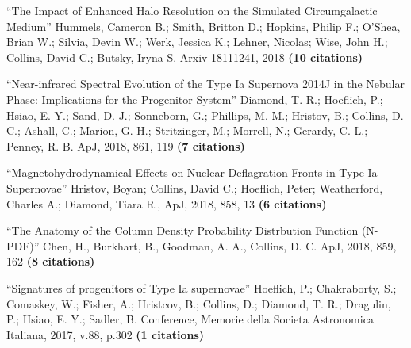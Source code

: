 \newcommand{\citeform}[1]{{\bf (#1 citations)}}

\medskip
\noindent
``The Impact of Enhanced Halo Resolution on the Simulated Circumgalactic Medium''
Hummels, Cameron B.; Smith, Britton D.; Hopkins, Philip F.; O'Shea, Brian W.; Silvia, Devin W.; 
Werk, Jessica K.; Lehner, Nicolas; Wise, John H.; Collins, David C.; Butsky, Iryna S.   
Arxiv 18111241, 2018
\citeform{10}%

\medskip
\noindent
``Near-infrared Spectral Evolution of the Type Ia Supernova 2014J in the Nebular
Phase: Implications for the Progenitor System''
Diamond, T. R.; Hoeflich, P.; Hsiao, E. Y.; Sand, D. J.; Sonneborn, G.;
Phillips, M. M.; Hristov, B.; Collins, D. C.; Ashall, C.; Marion, G. H.;
Stritzinger, M.; Morrell, N.; Gerardy, C. L.; Penney, R. B.
ApJ, 2018, 861, 119
\citeform{7}%

\medskip
\noindent
``Magnetohydrodynamical Effects on Nuclear Deflagration Fronts in Type Ia Supernovae''
Hristov, Boyan; Collins, David C.; Hoeflich, Peter; Weatherford, Charles A.; Diamond, Tiara R., 
ApJ, 2018, 858, 13
\citeform{6}%


\medskip
\noindent
``The Anatomy of the Column Density Probability Distrbution Function (N-PDF)''
Chen, H., Burkhart, B., Goodman, A. A., Collins, D. C. 
ApJ, 2018, 859, 162
\citeform{8}%

\medskip
\noindent
``Signatures of progenitors of Type Ia supernovae''
Hoeflich, P.; Chakraborty, S.; Comaskey, W.; Fisher, A.; Hristcov, B.; Collins, D.; Diamond, T. R.; Dragulin, P.; Hsiao, E. Y.; Sadler, B.
Conference, Memorie della Societa Astronomica Italiana, 2017, v.88, p.302
\citeform{1}%

